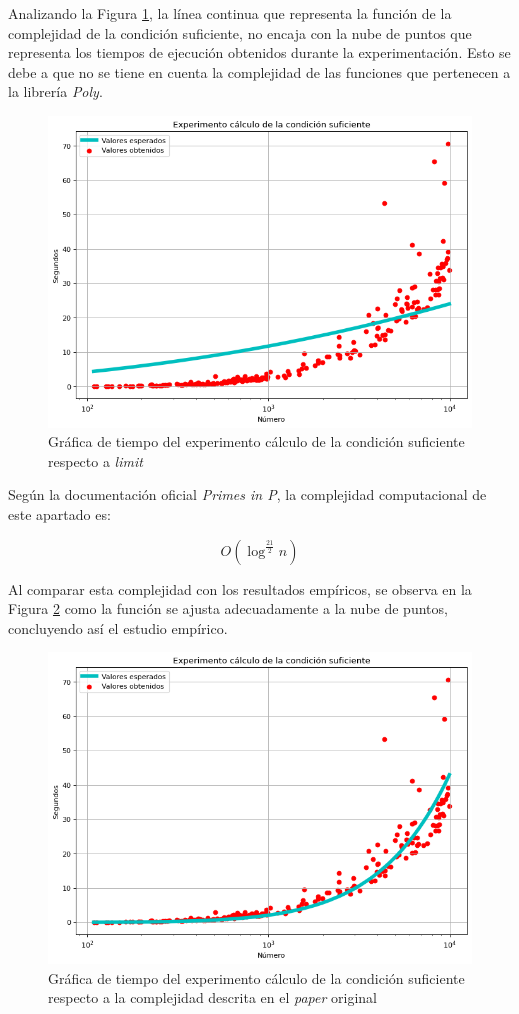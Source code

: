 \documentclass{uc3mpracticas}
\begin{document}
  Analizando la Figura \ref{fig:suficiente}, la línea continua que representa la función de la complejidad de la condición suficiente, no encaja con la nube de puntos que representa los tiempos de ejecución obtenidos durante la experimentación. Esto se debe a que no se tiene en cuenta la complejidad de las funciones que pertenecen a la librería \textit{Poly}.

  \begin{figure}[!h]
    \centering
    \includegraphics[width=.8\linewidth]{./Images/suficiente.png}
    \caption{Gráfica de tiempo del experimento cálculo de la condición suficiente respecto a \textit{limit}}
    \label{fig:suficiente}
  \end{figure}

  Según la documentación oficial \textit{Primes in P}\cite{primesinp}, la complejidad computacional de este apartado es:

  $$ O(\log^\frac{21}{2}n) $$

  \vspace{2mm}

  Al comparar esta complejidad con los resultados empíricos, se observa en la Figura \ref{fig:suficiente2} como la función se ajusta adecuadamente a la nube de puntos, concluyendo así el estudio empírico.

  \begin{figure}[!h]
    \centering
    \includegraphics[width=.8\linewidth]{./Images/suficiente2.png}
    \caption{Gráfica de tiempo del experimento cálculo de la condición suficiente respecto a la complejidad descrita en el \textit{paper} original\cite{primesinp}}
    \label{fig:suficiente2}
  \end{figure}
\end{document}
